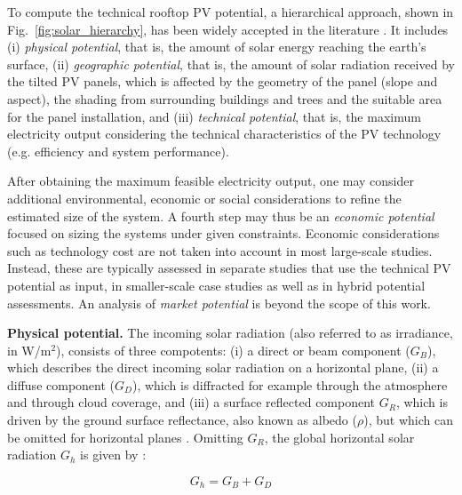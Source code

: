 To compute the technical rooftop PV potential,  a hierarchical approach, shown in Fig.~\ref{fig:solar_hierarchy}, has been widely accepted in the literature \cite{assouline_quantifying_2017,ramirez_camargo_spatio-temporal_2015,izquierdo_method_2008,wiginton_quantifying_2010}. It includes (i) \textit{physical potential}, that is, the amount of solar energy reaching the earth’s surface, (ii) \textit{geographic potential}, that is, the amount of solar radiation received by the tilted PV panels, which is affected by the geometry of the panel (slope and aspect), the shading from surrounding buildings and trees and the suitable area for the panel installation, and (iii) \textit{technical potential}, that is, the maximum electricity output considering the technical characteristics of the PV technology (e.g. efficiency and system performance).

After obtaining the maximum feasible electricity output, one may consider additional environmental, economic or social considerations to refine the estimated size of the system. A fourth step may thus be an \textit{economic potential} focused on sizing the systems under given constraints. Economic considerations such as technology cost are not taken into account in most large-scale studies. Instead, these are typically assessed in separate studies that use the technical PV potential as input, in smaller-scale case studies as well as in hybrid potential assessments. An analysis of \textit{market potential} is beyond the scope of this work. 

\textbf{Physical potential.} The incoming solar radiation (also referred to as irradiance, in W/m$^2$), consists of three compotents: (i) a direct or beam component ($G_B$), which describes the direct incoming solar radiation on a horizontal plane, (ii) a diffuse component ($G_D$), which is diffracted for example through the atmosphere and through cloud coverage, and (iii) a surface reflected component $G_R$, which is driven by the ground surface reflectance, also known as albedo ($\rho$), but which can be omitted for horizontal planes \cite{assouline_estimation_2017}. Omitting $G_R$, the global horizontal solar radiation $G_h$ is given by \cite{assouline_estimation_2017}:

\begin{equation}
\label{eq:Gh_method}
G_{h} = G_{B} + G_{D}
\end{equation}

